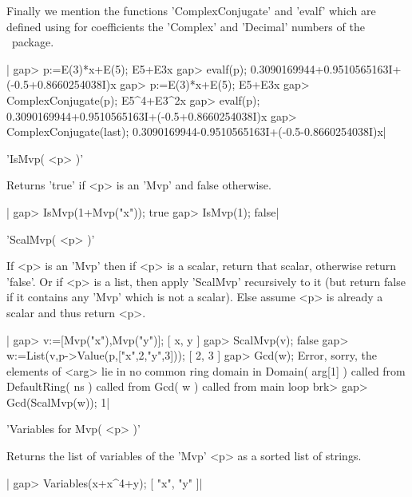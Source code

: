 Finally we  mention the  functions 'ComplexConjugate' and  'evalf' which
are defined using  for coefficients the 'Complex'  and 'Decimal' numbers
of the \CHEVIE\ package.

|    gap> p:=E(3)*x+E(5);
    E5+E3x
    gap> evalf(p);
    0.3090169944+0.9510565163I+(-0.5+0.8660254038I)x
    gap> p:=E(3)*x+E(5);          
    E5+E3x
    gap> ComplexConjugate(p);
    E5^4+E3^2x
    gap> evalf(p);
    0.3090169944+0.9510565163I+(-0.5+0.8660254038I)x
    gap> ComplexConjugate(last);
    0.3090169944-0.9510565163I+(-0.5-0.8660254038I)x|

%
%

'IsMvp( <p> )'

Returns 'true' if <p> is an 'Mvp' and false otherwise.

|    gap> IsMvp(1+Mvp("x"));
    true
    gap> IsMvp(1);         
    false|

%
%

'ScalMvp( <p> )'

If  <p> is  an  'Mvp' then  if  <p>  is a  scalar,  return that  scalar,
otherwise return  'false'. Or  if <p>  is a  list, then  apply 'ScalMvp'
recursively to  it (but return false  if it contains any  'Mvp' which is
not a scalar). Else assume <p> is already a scalar and thus return <p>.

|    gap> v:=[Mvp("x"),Mvp("y")];        
    [ x, y ]
    gap> ScalMvp(v);
    false
    gap> w:=List(v,p->Value(p,["x",2,"y",3]));
    [ 2, 3 ]
    gap> Gcd(w);
    Error, sorry, the elements of <arg> lie in no common ring domain in
    Domain( arg[1] ) called from
    DefaultRing( ns ) called from
    Gcd( w ) called from
    main loop
    brk> 
    gap> Gcd(ScalMvp(w));
    1|

%
%

'Variables for Mvp( <p> )'

Returns the list of variables of the 'Mvp' <p> as a sorted list of strings.

|    gap> Variables(x+x^4+y);
    [ "x", "y" ]|

%
%

